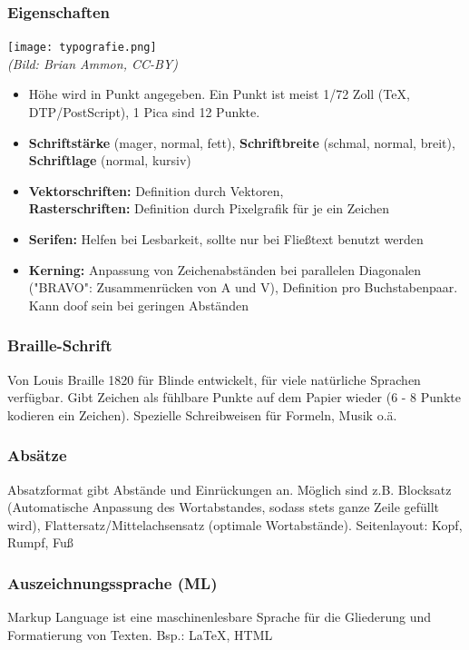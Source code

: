 \documentclass[12pt,landscape]{article}
\begin{document}
\begin{multicols}{3}
\subsubsection{Eigenschaften}
\begin{center}
\texttt{[image: typografie.png]}\\
\tiny{\textit{(Bild: Brian Ammon, CC-BY)}}
\end{center}
\begin{itemize}
\item Höhe wird in Punkt angegeben. Ein Punkt ist meist 1/72 Zoll (TeX, DTP/PostScript), 1 Pica sind 12 Punkte.
\item \textbf{Schriftstärke} (mager, normal, fett), \textbf{Schriftbreite} (schmal, normal, breit), \textbf{Schriftlage} (normal, kursiv)
\item \textbf{Vektorschriften:} Definition durch Vektoren,\\
\textbf{Rasterschriften:} Definition durch Pixelgrafik für je ein Zeichen
\item \textbf{Serifen:} Helfen bei Lesbarkeit, sollte nur bei Fließtext benutzt werden
\item \textbf{Kerning:} Anpassung von Zeichenabständen bei parallelen Diagonalen ("BRAVO": Zusammenrücken von A und V), Definition pro Buchstabenpaar. Kann doof sein bei geringen Abständen
\end{itemize}
\subsubsection{Braille-Schrift}
Von Louis Braille 1820 für Blinde entwickelt, für viele natürliche Sprachen verfügbar. Gibt Zeichen als fühlbare Punkte auf dem Papier wieder (6 - 8 Punkte kodieren ein Zeichen). Spezielle Schreibweisen für Formeln, Musik o.ä.
\subsubsection{Absätze}
Absatzformat gibt Abstände und Einrückungen an. Möglich sind z.B. Blocksatz (Automatische Anpassung des Wortabstandes, sodass stets ganze Zeile gefüllt wird), Flattersatz/Mittelachsensatz (optimale Wortabstände). Seitenlayout: Kopf, Rumpf, Fuß
\subsubsection{Auszeichnungssprache (ML)}
Markup Language ist eine maschinenlesbare Sprache für die Gliederung und Formatierung von Texten. Bsp.: \LaTeX, HTML

\end{multicols}
\end{document}
